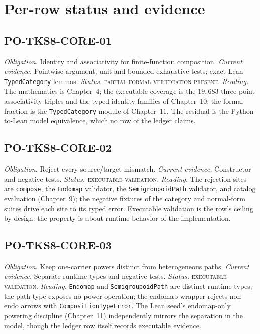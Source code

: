\section{Per-row status and evidence}\label{appB:sec:rows}

\subsection*{PO-TKS8-CORE-01}
\emph{Obligation.} Identity and associativity for finite-function
composition. \emph{Current evidence.} Pointwise argument; unit and
bounded exhaustive tests; exact Lean \texttt{TypedCategory} lemmas.
\emph{Status.} \textsc{partial formal verification present}.
\emph{Reading.} The mathematics is Chapter~4; the executable coverage
is the $19{,}683$ three-point associativity triples and the typed
identity families of Chapter~10; the formal fraction is the
\texttt{TypedCategory} module of Chapter~11. The residual is the
Python-to-Lean model equivalence, which no row of the ledger claims.

\subsection*{PO-TKS8-CORE-02}
\emph{Obligation.} Reject every source/target mismatch.
\emph{Current evidence.} Constructor and negative tests.
\emph{Status.} \textsc{executable validation}.
\emph{Reading.} The rejection sites are \texttt{compose}, the
\texttt{Endomap} validator, the \texttt{SemigroupoidPath} validator,
and catalog evaluation (Chapter~9); the negative fixtures of the
category and normal-form suites drive each site to its typed error.
Executable validation is the row's ceiling by design: the property is
about runtime behavior of the implementation.

\subsection*{PO-TKS8-CORE-03}
\emph{Obligation.} Keep one-carrier powers distinct from heterogeneous
paths. \emph{Current evidence.} Separate runtime types and negative
tests. \emph{Status.} \textsc{executable validation}.
\emph{Reading.} \texttt{Endomap} and \texttt{SemigroupoidPath} are
distinct runtime types; the path type exposes no power operation; the
endomap wrapper rejects non-endo arrows with
\texttt{CompositionTypeError}. The Lean seed's endomap-only powering
discipline (Chapter~11) independently mirrors the separation in the
model, though the ledger row itself records executable evidence.

